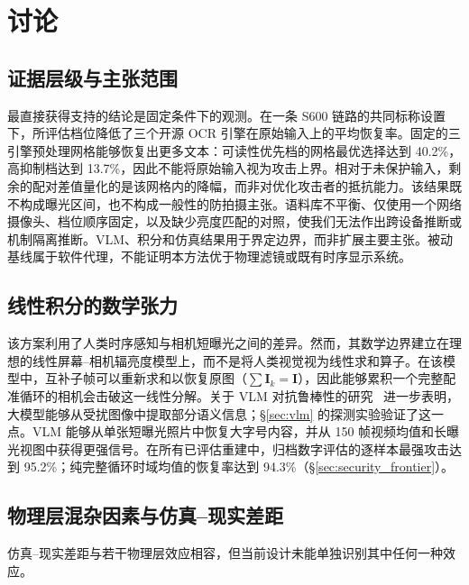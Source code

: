 \documentclass{ieeeaccess}
\begin{document}

\section{讨论}
\label{sec:discussion}

\subsection{证据层级与主张范围}

最直接获得支持的结论是固定条件下的观测。在一条 S600 链路的共同标称设置下，所评估档位降低了三个开源 OCR 引擎在原始输入上的平均恢复率。固定的三引擎预处理网格能够恢复出更多文本：可读性优先档的网格最优选择达到 40.2\%，高抑制档达到 13.7\%，因此不能将原始输入视为攻击上界。相对于未保护输入，剩余的配对差值量化的是该网格内的降幅，而非对优化攻击者的抵抗能力。该结果既不构成曝光区间，也不构成一般性的防拍摄主张。语料库不平衡、仅使用一个网络摄像头、档位顺序固定，以及缺少亮度匹配的对照，使我们无法作出跨设备推断或机制隔离推断。VLM、积分和仿真结果用于界定边界，而非扩展主要主张。被动基线属于软件代理，不能证明本方法优于物理滤镜或既有时序显示系统。

\subsection{线性积分的数学张力}

该方案利用了人类时序感知与相机短曝光之间的差异。然而，其数学边界建立在理想的线性屏幕--相机辐亮度模型上，而不是将人类视觉视为线性求和算子。在该模型中，互补子帧可以重新求和以恢复原图（$\sum\mathbf{I}_k = \mathbf{I}$），因此能够累积一个完整配准循环的相机会击破这一线性分解。关于 VLM 对抗鲁棒性的研究~\cite{b_jiang2025} 进一步表明，大模型能够从受扰图像中提取部分语义信息；\S\ref{sec:vlm} 的探测实验验证了这一点。VLM 能够从单张短曝光照片中恢复大字号内容，并从 150 帧视频均值和长曝光视图中获得更强信号。在所有已评估重建中，归档数字评估的逐样本最强攻击达到 95.2\%；纯完整循环时域均值的恢复率达到 94.3\%（\S\ref{sec:security_frontier}）。

\subsection{物理层混杂因素与仿真--现实差距}

仿真--现实差距与若干物理层效应相容，但当前设计未能单独识别其中任何一种效应。
\end{document}
